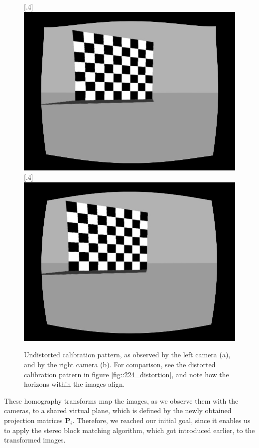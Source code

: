 \begin{figure}[h!]
	\centering
	\subcaptionbox{}%
	[.4\linewidth]{\includegraphics[scale=.2]{chapters/02_background/img/gazebo_rectified_left.jpg}}
	\subcaptionbox{}%
	[.4\linewidth]{\includegraphics[scale=.2]{chapters/02_background/img/gazebo_rectified_right.jpg}}
	\caption{Undistorted calibration pattern, as observed by the left camera (a), and by the right camera (b). For comparison, see the distorted calibration pattern in figure \ref{fig::224_distortion}, and note how the horizons within the images align.}
	\label{fig::224_rectified}
\end{figure}
These homography transforms map the images, as we observe them with the cameras, to a shared virtual plane, which is defined by the newly obtained projection matrices $\bm{P}_i$. Therefore, we reached our initial goal, since it enables us to apply the stereo block matching algorithm, which got introduced earlier, to the transformed images.